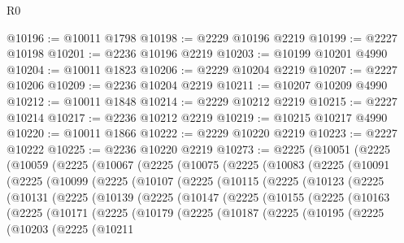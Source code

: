 \begin{lexlean}{R0}
\begin{coremodule}
@10196 := @10011 @1798
@10198 := @2229 @10196 @2219
@10199 := @2227 @10198
@10201 := @2236 @10196 @2219
@10203 := @10199 @10201 @4990
@10204 := @10011 @1823
@10206 := @2229 @10204 @2219
@10207 := @2227 @10206
@10209 := @2236 @10204 @2219
@10211 := @10207 @10209 @4990
@10212 := @10011 @1848
@10214 := @2229 @10212 @2219
@10215 := @2227 @10214
@10217 := @2236 @10212 @2219
@10219 := @10215 @10217 @4990
@10220 := @10011 @1866
@10222 := @2229 @10220 @2219
@10223 := @2227 @10222
@10225 := @2236 @10220 @2219
@10273 := @2225
    (@10051
      (@2225
        (@10059
          (@2225
            (@10067
              (@2225
                (@10075
                  (@2225
                    (@10083
                      (@2225
                        (@10091
                          (@2225
                            (@10099
                              (@2225
                                (@10107
                                  (@2225
                                    (@10115
                                      (@2225
                                        (@10123
                                          (@2225
                                            (@10131
                                              (@2225
                                                (@10139
                                                  (@2225
                                                    (@10147
                                                      (@2225
                                                        (@10155
                                                          (@2225
                                                            (@10163
                                                              (@2225
                                                                (@10171
                                                                  (@2225
                                                                    (@10179
                                                                      (@2225
                                                                        (@10187
                                                                          (@2225
                                                                            (@10195
                                                                              (@2225
                                                                                (@10203
                                                                                  (@2225
                                                                                    (@10211

\end{coremodule}
\end{lexlean}
